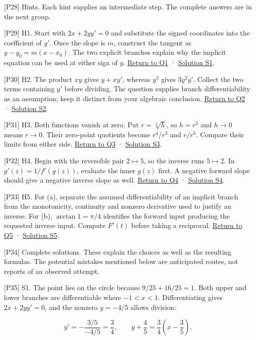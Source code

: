 \documentclass[
  11pt,
]{article}
\providecommand{\lt}{<}
\begin{document}
{[}P28{]} Hints. Each hint supplies an intermediate step. The complete
answers are in the next group.

{[}P29{]} H1. Start with \(2x+2yy'=0\) and substitute the signed
coordinates into the coefficient of \(y'\). Once the slope is \(m\),
construct the tangent as \(y-y_0=m(x-x_0)\). The two explicit branches
explain why the implicit equation can be used at either sign of \(y\).
\protect\hyperlink{q1}{Return to Q1} · \protect\hyperlink{s1}{Solution
S1}.

{[}P30{]} H2. The product \(xy\) gives \(y+xy'\), whereas \(y^3\) gives
\(3y^2y'\). Collect the two terms containing \(y'\) before dividing. The
question supplies branch differentiability as an assumption; keep it
distinct from your algebraic conclusion. \protect\hyperlink{q2}{Return
to Q2} · \protect\hyperlink{s2}{Solution S2}.

{[}P31{]} H3. Both functions vanish at zero. Put \(r=\sqrt[3]{h}\), so
\(h=r^3\) and \(h\to0\) means \(r\to0\). Their zero-point quotients
become \(r^4/r^3\) and \(r/r^3\). Compare their limits from either side.
\protect\hyperlink{q3}{Return to Q3} · \protect\hyperlink{s3}{Solution
S3}.

{[}P32{]} H4. Begin with the reversible pair \(2\mapsto5\), so the
inverse runs \(5\mapsto2\). In \(g'(z)=1/f'(g(z))\), evaluate the inner
\(g(z)\) first. A negative forward slope should give a negative inverse
slope as well. \protect\hyperlink{q4}{Return to Q4} ·
\protect\hyperlink{s4}{Solution S4}.

{[}P33{]} H5. For (a), separate the assumed differentiability of an
implicit branch from the monotonicity, continuity and nonzero derivative
used to justify an inverse. For (b), \(\arctan1=\pi/4\) identifies the
forward input producing the requested inverse input. Compute \(F'(t)\)
before taking a reciprocal. \protect\hyperlink{q5}{Return to Q5} ·
\protect\hyperlink{s5}{Solution S5}.

{[}P34{]} Complete solutions. These explain the choices as well as the
resulting formulas. The potential mistakes mentioned below are
anticipated routes, not reports of an observed attempt.

{[}P35{]} S1. The point lies on the circle because \(9/25+16/25=1\).
Both upper and lower branches are differentiable where \(-1\lt x\lt 1\).
Differentiating gives \(2x+2yy'=0\), and the nonzero \(y=-4/5\) allows
division:

\[
y'=-\frac{3/5}{-4/5}=\frac34,
\qquad y+\frac45=\frac34\left(x-\frac35\right).
\]
\end{document}
